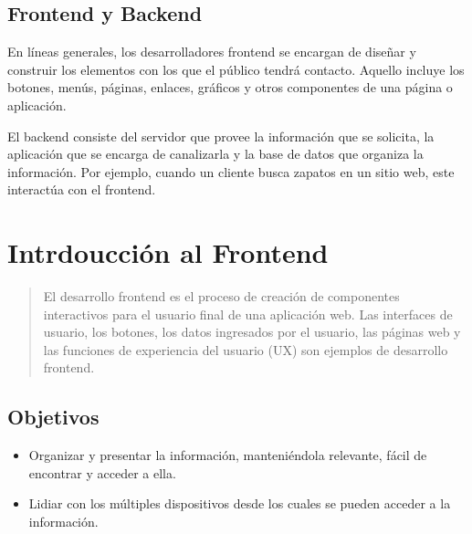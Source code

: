 \subsection*{Frontend y Backend}
\begin{center}
\begin{minipage}[position]{0.40\textwidth}
    En líneas generales, los
    desarrolladores frontend se
    encargan de diseñar y construir
    los elementos con los que el
    público tendrá contacto. Aquello
    incluye los botones, menús,
    páginas, enlaces, gráficos y otros
    componentes de una página o
    aplicación.
\end{minipage}
\hspace{5mm}
\begin{minipage}[position]{0.40\textwidth}
    El backend consiste del servidor
    que provee la información que se
    solicita, la aplicación que se
    encarga de canalizarla y la base
    de datos que organiza la
    información. Por ejemplo, cuando
    un cliente busca zapatos en un
    sitio web, este interactúa con el
    frontend.
\end{minipage}
\end{center}

\section{Intrdoucción al Frontend}

\begin{quote}
El desarrollo frontend es el proceso de creación de componentes interactivos para 
el usuario final de una aplicación web. Las interfaces de usuario, los botones, los
datos ingresados por el usuario, las páginas web y las funciones de experiencia 
del usuario (UX) son ejemplos de desarrollo frontend.
\end{quote}

\subsection*{Objetivos}
\begin{itemize}
    \item Organizar y presentar la información, manteniéndola relevante,
     fácil de encontrar y acceder a ella.
    \item Lidiar con los múltiples dispositivos desde los cuales se 
     pueden acceder a la información.    
\end{itemize}

